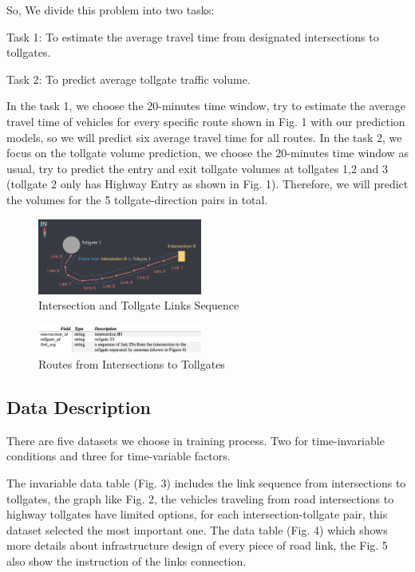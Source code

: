 \documentclass[journal, letterpaper]{IEEEtran}
\begin{document}
So, We divide this problem into two tasks: 

	Task 1: To estimate the average travel time from designated intersections to tollgates. 
    
    Task 2: To predict average tollgate traffic volume.

In the task 1, we choose the 20-minutes time window, try to estimate the average travel time of vehicles for every specific route shown in Fig. 1 with our prediction models, so we will predict six average travel time for all routes. In the task 2, we focus on the tollgate volume prediction, we choose the 20-minutes time window as usual, try to predict the entry and exit tollgate volumes at tollgates 1,2 and 3 (tollgate 2 only has Highway Entry as shown in Fig. 1). Therefore, we will predict the volumes for the 5 tollgate-direction pairs in total.

\begin{figure} [t]
  \centering
  \includegraphics[width=0.48\textwidth]{link-sequence.png}
  \caption{Intersection and Tollgate Links Sequence}
  \label{fig:2}
\end{figure}

\begin{figure} [H]
  \centering
  \includegraphics[width=0.48\textwidth]{route.png}
  \caption{Routes from Intersections to Tollgates}
  \label{fig:3}
\end{figure}

\subsection{Data Description}

There are five datasets we choose in training process. Two for time-invariable conditions and three for time-variable factors. 

The invariable data table (Fig. 3) includes the link sequence from intersections to tollgates, the graph like Fig. 2, the vehicles traveling from road intersections to highway tollgates have limited options, for each intersection-tollgate pair, this dataset selected the most important one. The data table (Fig. 4) which shows more details about infrastructure design of every piece of road link, the Fig. 5 also show the instruction of the links connection. 
\end{document}
